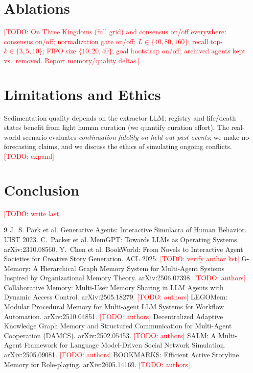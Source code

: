 \documentclass[11pt]{article}
\newcommand{\todo}[1]{\textcolor{red}{[TODO: #1]}}
\begin{document}
\section{Ablations}
\label{sec:ablations}
\todo{On Three Kingdoms (full grid) and consensus on/off everywhere:
consensus on/off; normalization gate on/off; $L \in \{40, 80, 160\}$;
recall top-$k \in \{3,5,10\}$; FIFO size $\{10,20,40\}$; goal bootstrap on/off;
archived agents kept vs.\ removed. Report memory/quality deltas.}

\section{Limitations and Ethics}
\label{sec:limitations}
Sedimentation quality depends on the extractor LLM; registry and life/death
states benefit from light human curation (we quantify curation effort).
The real-world scenario evaluates \emph{continuation fidelity on held-out past
events}; we make no forecasting claims, and we discuss the ethics of simulating
ongoing conflicts. \todo{expand}

\section{Conclusion}
\todo{write last}


\begin{thebibliography}{9}
 J.~S. Park et al. Generative Agents: Interactive
Simulacra of Human Behavior. UIST 2023.
 C.~Packer et al. MemGPT: Towards LLMs as Operating
Systems. arXiv:2310.08560.
 Y.~Chen et al. BookWorld: From Novels to
Interactive Agent Societies for Creative Story Generation. ACL 2025.
\todo{verify author list}
 G-Memory: A Hierarchical Graph Memory System for
Multi-Agent Systems Inspired by Organizational Memory Theory.
arXiv:2506.07398. \todo{authors}
 Collaborative Memory: Multi-User Memory Sharing in
LLM Agents with Dynamic Access Control. arXiv:2505.18279. \todo{authors}
 LEGOMem: Modular Procedural Memory for Multi-agent LLM
Systems for Workflow Automation. arXiv:2510.04851. \todo{authors}
 Decentralized Adaptive Knowledge Graph Memory and
Structured Communication for Multi-Agent Cooperation (DAMCS).
arXiv:2502.05453. \todo{authors}
 SALM: A Multi-Agent Framework for Language Model-Driven
Social Network Simulation. arXiv:2505.09081. \todo{authors}
 BOOKMARKS: Efficient Active Storyline Memory for
Role-playing. arXiv:2605.14169. \todo{authors}
\end{thebibliography}
\end{document}
